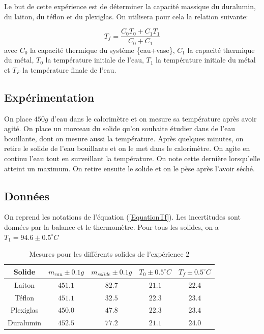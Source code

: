 \documentclass[12pt]{article}
\begin{document}
Le but de cette expérience est de déterminer la capacité massique du duralumin, du laiton, du téflon et du plexiglas. On utilisera pour cela la relation suivante:

\begin{equation}
	T_f=\frac{C_0T_0+C_1T_1}{C_0+C_1}
\label{EquationTf}
\end{equation}
avec $C_0$ la capacité thermique du système \{eau+vase\}, $C_1$ la capacité thermique du métal, $T_0$ la température initiale de l'eau, $T_1$ la température initiale du métal et $T_F$ la température finale de l'eau.

\subsection{Expérimentation}

On place $450g$ d'eau dans le calorimètre et on mesure sa température après avoir agité. On place un morceau du solide qu'on souhaite étudier dans de l'eau bouillante, dont on mesure aussi la température. 
Après quelques minutes, on retire le solide de l'eau bouillante et on le met dans le calorimètre. 
On agite en continu l'eau tout en surveillant la température. On note cette dernière lorsqu'elle atteint un maximum. 
On retire ensuite le solide et on le pèse après l'avoir séché.

\subsection{Données}
On reprend les notations de l'équation (\ref{EquationTf}). Les incertitudes sont données par la balance et le thermomètre. Pour tous les solides, on a $T_1=94.6\pm 0.5^{\circ}C$
\begin{table}[h!]
	\begin{center}
		\begin{tabular}{|c|c|c|c|c|}
		\hline
		Solide & $m_{eau} \pm 0.1g$ & $m_{solide}\pm 0.1g$ & $T_0\pm 0.5^{\circ}C$ & $T_f\pm 0.5^{\circ}C$\\ \hline
		Laiton & $451.1$ & $82.7$ & $21.1$ & $22.4$ \\
		Téflon & $451.1$ & $32.5$ & $22.3$ & $23.4$ \\
		Plexiglas & $450.0$ & $47.8$ & $22.3$ & $23.4$ \\
		Duralumin & $452.5$ & $77.2$ & $21.1$ & $24.0$ \\ \hline
		\end{tabular}
		\caption{Mesures pour les différents solides de l'expérience 2}
		\label{table:mesureexp2}
	\end{center}
\end{table}
\end{document}
